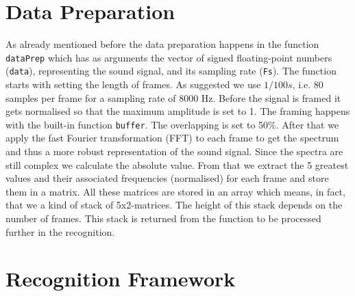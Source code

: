 \documentclass[a4paper,english,11pt,oneside]{article}
\begin{document}

\section{Data Preparation}\label{sec:prep}
As already mentioned before the data preparation happens in the function \lstinline&dataPrep& which has as arguments the vector of signed floating-point numbers (\lstinline&data&), representing the sound signal, and its sampling rate (\lstinline&Fs&). The function starts with setting the length of frames. As suggested we use $1/100 s$, i.e. 80 samples per frame for a sampling rate of 8000 Hz. Before the signal is framed it gets normalised so that the maximum amplitude is set to 1. The framing happens with the built-in function \lstinline&buffer&. The overlapping is set to 50\%. After that we apply the fast Fourier transformation (FFT) to each frame to get the spectrum and thus a more robust representation of the sound signal. Since the spectra are still complex we calculate the absolute value. From that we extract the 5 greatest values and their associated frequencies (normalised) for each frame and store them in a matrix. All these matrices are stored in an array which means, in fact, that we a kind of stack of 5x2-matrices. The height of this stack depends on the number of frames. This stack is returned from the function to be processed further in the recognition.

\section{Recognition Framework} 
\begin{lstlisting}
\end{lstlisting}
\end{document}
